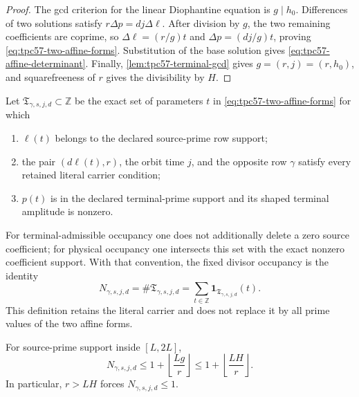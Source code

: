 \begin{proof}
The gcd criterion for the linear Diophantine equation is
\(g\mid h_0\).  Differences of two solutions satisfy
\(r\Delta p=dj\Delta\ell\).  After division by \(g\), the two remaining
coefficients are coprime, so
\(\Delta\ell=(r/g)t\) and
\(\Delta p=(dj/g)t\), proving
\eqref{eq:tpc57-two-affine-forms}.  Substitution of the base solution
gives \eqref{eq:tpc57-affine-determinant}.  Finally,
\cref{lem:tpc57-terminal-gcd} gives \(g=(r,j)=(r,h_0)\), and
squarefreeness of \(r\) gives the divisibility by \(H\).
\end{proof}

Let \(\mathfrak T_{\gamma,s,j,d}\subset\mathbb Z\) be the exact set of
parameters \(t\) in \eqref{eq:tpc57-two-affine-forms} for which
\begin{enumerate}[label=\textup{(\roman*)},leftmargin=3em]
 \item \(\ell(t)\) belongs to the declared source-prime row support;
 \item the pair \((d\ell(t),r)\), the orbit time \(j\), and the opposite
       row \(\gamma\) satisfy every retained literal carrier condition;
 \item \(p(t)\) is in the declared terminal-prime support and its shaped
       terminal amplitude is nonzero.
\end{enumerate}
For terminal-admissible occupancy one does not additionally delete a zero
source coefficient; for physical occupancy one intersects this set with
the exact nonzero coefficient support.  With that convention, the fixed
divisor occupancy is the identity
\begin{equation}
 N_{\gamma,s,j,d}
 =\#\mathfrak T_{\gamma,s,j,d}
 =\sum_{t\in\mathbb Z}
   \mathbf 1_{\mathfrak T_{\gamma,s,j,d}}(t).
 \label{eq:tpc57-exact-ladder-occupancy}
\end{equation}
This definition retains the literal carrier and does not replace it by
all prime values of the two affine forms.

\begin{corollary}
\label{cor:tpc57-ladder-capacity}
For source-prime support inside \([L,2L]\),
\begin{equation}
 N_{\gamma,s,j,d}
 \le1+\left\lfloor\frac{Lg}{r}\right\rfloor
 \le1+\left\lfloor\frac{LH}{r}\right\rfloor.
 \label{eq:tpc57-exact-ladder-capacity}
\end{equation}
In particular, \(r>LH\) forces \(N_{\gamma,s,j,d}\le1\).
\end{corollary}

